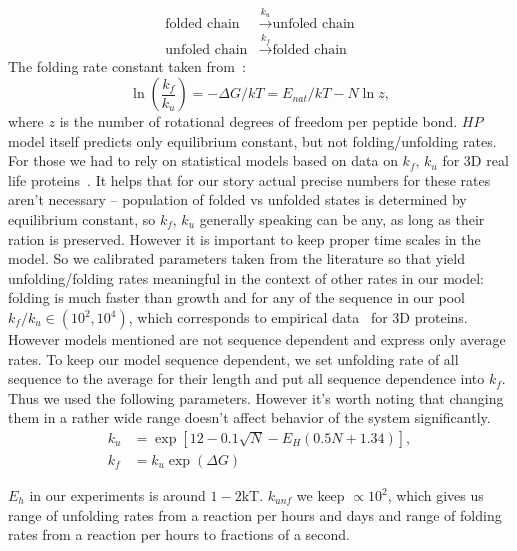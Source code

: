 \documentclass[journal=jacsat,manuscript=article,layout=twocolumn]{achemso}
\newcommand*{\gD}{\Delta}
\newcommand*{\pt}[1]{\left( #1\right)}
\begin{document}
\begin{itemize}
\begin{equation}
\begin{split}
 \mbox{folded chain}&\xrightarrow{k_u}\mbox{unfoled chain}  \\
 \mbox{unfoled chain}&\xrightarrow{k_f}\mbox{folded chain}
\end{split}
\end{equation}
The folding rate constant taken 
from~\cite{Ghosh2009}:
\begin{equation}
 \ln\pt{\frac{k_f}{k_u}}=-\gD G/kT = E_{nat}/kT-N\ln z,
\end{equation} 
 where $z$ is the number of rotational degrees of freedom per peptide bond.
 $HP$ model itself predicts only equilibrium constant, but not folding/unfolding rates.
 For those we had to rely on statistical models based on data on $k_f,\,k_u$ for 3D real life 
proteins~\cite{Ghosh2010,Dill2011}.
It helps that for our story actual precise numbers for these rates aren't necessary -- population 
of folded vs unfolded states is determined by equilibrium constant, so $k_f,\,k_u$ generally 
speaking can be any, as long as their ration is preserved. However it is important to keep proper 
time scales in the model. So we calibrated parameters taken from the literature so that yield 
unfolding/folding rates meaningful in the context of other rates in our model: folding is much 
faster than growth and for any of the sequence in our pool $k_f/k_u\in (10^2,10^4)$, which 
corresponds to empirical data~\cite{Ghosh2010,Dill2011} for 3D proteins.
However models mentioned are not sequence dependent and express only average rates. To keep our 
model sequence dependent, we set unfolding rate of all sequence to the average for their length 
and put all sequence dependence into $k_f$. Thus we used the following parameters. However it's 
worth noting that changing them in a rather wide range doesn't affect behavior of the system 
significantly.
\begin{equation}
\begin{split}
  k_u &= \exp[12-0.1 \sqrt{N} -E_H(0.5 N + 1.34)],\\
  k_f &= k_u\exp(\gD G)
\end{split}
\end{equation}

$E_h$ in our experiments is around $1-2$kT. $k_{unf}$ we keep $\propto 10^2$, which 
gives us range of unfolding rates from a reaction per hours and days and range of folding rates 
from a reaction per hours to fractions of a second.


\end{itemize}
\end{document}

